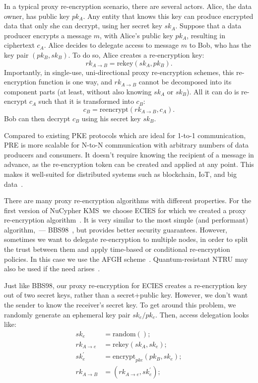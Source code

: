 \documentclass[longbibliography,nofootinbib]{revtex4-1}
\newcommand{\kms}{NuCypher KMS}
\begin{document}
In a typical proxy re-encryption scenario, there are several actors. 
Alice, the data owner, has public key $pk_A$. Any entity that knows this key can produce encrypted data that only she can decrypt, using her secret key $sk_A$. 
Suppose that a data producer encrypts a message $m$, with Alice's public key $pk_A$, 
resulting in ciphertext $c_A$.
Alice decides to delegate access to message $m$ to Bob, who has the key pair $(pk_B, sk_B)$.
To do so, Alice creates a re-encryption key:
\begin{equation}
    rk_{A\rightarrow B} = \text{rekey}(sk_A, pk_B).
\end{equation}
Importantly, in single-use, uni-directional proxy re-encryption schemes, this re-encryption function is one way, and $rk_{A\rightarrow B}$ cannot be decomposed into its component parts
(at least, without also knowing $sk_A$ or $sk_B$).
All it can do is re-encrypt $c_A$ such that it is transformed into $c_B$:
\begin{equation}
    c_B = \text{reencrypt}(rk_{A\rightarrow B}, c_{A}).
\end{equation}
Bob can then decrypt $c_{B}$ using his secret key $sk_{B}$.

Compared to existing PKE protocols which are ideal for 1-to-1 communication, PRE is more scalable for N-to-N communication
with arbitrary numbers of data producers and consumers.
It doesn't require knowing the recipient of a message in advance, as the re-encryption token can be created and applied at any point.
This makes it well-suited for distributed systems such as blockchain, IoT, and big data~\cite{web:nucypher-hadoop}.

There are many proxy re-encryption algorithms with different properties.
For the first version of \kms~we choose ECIES for which we created a proxy re-encryption algorithm~\cite{umbral-spec}.
It is very similar to the most simple (and performant) algorithm,~--- BBS98~\cite{BBS98}, but provides better security guarantees.
However, sometimes we want to delegate re-encryption to multiple nodes, in order to split the trust between them and apply time-based or conditional
re-encryption policies.
In this case we use the AFGH scheme~\cite{AFGH}.
Quantum-resistant NTRU may also be used if the need arises~\cite{wiki:ntru,ntrureencrypt}.

Just like BBS98, our proxy re-encryption for ECIES creates a re-encryption key out of two secret keys, rather than a secret+public key.
However, we don't want the sender to know the receiver's secret key.
To get around this problem, we randomly generate an ephemeral key pair $sk_e/pk_e$.
Then, access delegation looks like:
\begin{align}
    \label{eq:ephemeral-trick}
    sk_e &= \text{random}();\\
    rk_{A\rightarrow e} &= \text{rekey}(sk_A, sk_e);\\
    \label{eq:ephemeral-trick-end}
    sk_e^{\prime} &= \text{encrypt}_{pke}(pk_B, sk_e);\\
    rk_{A\rightarrow B} &= (rk_{A\rightarrow e}, sk_e^{\prime});
\end{align}
\end{document}
